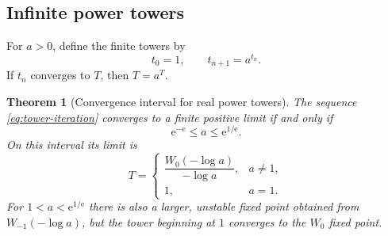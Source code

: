 \documentclass[11pt]{article}
\numberwithin{equation}{section}
\newtheorem{theorem}{Theorem}[section]
\theoremstyle{definition}
\theoremstyle{remark}
\newcommand{\e}{\mathrm e}
\begin{document}
\subsection{Infinite power towers}

For $a>0$, define the finite towers by
\begin{equation}
 t_0=1,
 \qquad
 t_{n+1}=a^{t_n}.                                      \label{eq:tower-iteration}
\end{equation}
If $t_n$ converges to $T$, then $T=a^T$.

\begin{theorem}[Convergence interval for real power towers]
\label{thm:power-tower}
The sequence \eqref{eq:tower-iteration} converges to a finite positive limit
if and only if
\begin{equation}
  \e^{-\e}\le a\le\e^{1/\e}.                          \label{eq:tower-interval}
\end{equation}
On this interval its limit is
\begin{equation}
 T=\begin{cases}
 \dfrac{W_0(-\log a)}{-\log a},&a\ne1,\\[2ex]
 1,&a=1.
 \end{cases}                                           \label{eq:tower-limit}
\end{equation}
For $1<a<\e^{1/\e}$ there is also a larger, unstable fixed point obtained from
$W_{-1}(-\log a)$, but the tower beginning at $1$ converges to the $W_0$
fixed point.
\end{theorem}
\end{document}
